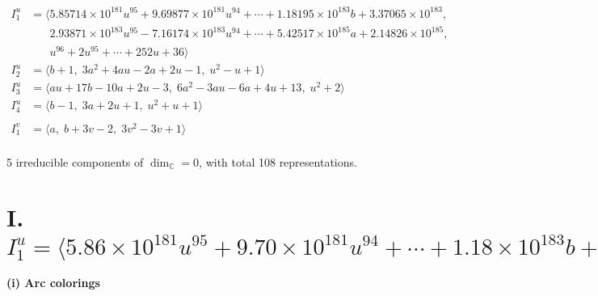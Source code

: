 \documentclass[1p]{elsarticle_modified}
\theoremstyle{definition}
\begin{document}
\begin{align*}
I^u_{1}&=\langle 
5.85714\times10^{181} u^{95}+9.69877\times10^{181} u^{94}+\cdots+1.18195\times10^{183} b+3.37065\times10^{183},\\
\phantom{I^u_{1}}&\phantom{= \langle  }2.93871\times10^{183} u^{95}-7.16174\times10^{183} u^{94}+\cdots+5.42517\times10^{185} a+2.14826\times10^{185},\\
\phantom{I^u_{1}}&\phantom{= \langle  }u^{96}+2 u^{95}+\cdots+252 u+36\rangle \\
I^u_{2}&=\langle 
b+1,\;3 a^2+4 a u-2 a+2 u-1,\;u^2- u+1\rangle \\
I^u_{3}&=\langle 
a u+17 b-10 a+2 u-3,\;6 a^2-3 a u-6 a+4 u+13,\;u^2+2\rangle \\
I^u_{4}&=\langle 
b-1,\;3 a+2 u+1,\;u^2+u+1\rangle \\
\\
I^v_{1}&=\langle 
a,\;b+3 v-2,\;3 v^2-3 v+1\rangle \\
\end{align*}
\raggedright * 5 irreducible components of $\dim_{\mathbb{C}}=0$, with total 108 representations.\\
\newpage
\renewcommand{\arraystretch}{1}
\centering \section*{I. $I^u_{1}= \langle 5.86\times10^{181} u^{95}+9.70\times10^{181} u^{94}+\cdots+1.18\times10^{183} b+3.37\times10^{183},\;2.94\times10^{183} u^{95}-7.16\times10^{183} u^{94}+\cdots+5.43\times10^{185} a+2.15\times10^{185},\;u^{96}+2 u^{95}+\cdots+252 u+36 \rangle$}
\flushleft \textbf{(i) Arc colorings}\\
\end{document}
